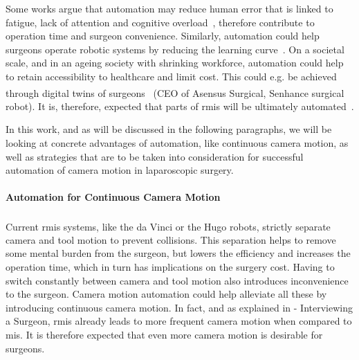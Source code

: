 
Some works argue that automation may reduce human error that is linked to fatigue, lack of attention and cognitive overload~\cite{fiorini2022concepts}, therefore contribute to operation time and surgeon convenience. Similarly, automation could help surgeons operate robotic systems by reducing the learning curve~\cite{van2018learning}. On a societal scale, and in an ageing society with shrinking workforce, automation could help to retain accessibility to healthcare and limit cost. This could e.g. be achieved through digital twins of surgeons~\cite{zidane2023robotics} (CEO of Asensus Surgical, Senhance\textsuperscript{\texttrademark} surgical robot). It is, therefore, expected that parts of \gls{rmis} will be ultimately automated~\cite{davenport2019potential,zidane2023robotics}.

In this work, and as will be discussed in the following paragraphs, we will be looking at concrete advantages of automation, like continuous camera motion, as well as strategies that are to be taken into consideration for successful automation of camera motion in laparoscopic surgery.


\paragraph{Automation for Continuous Camera Motion} Current \gls{rmis} systems, like the da Vinci\textsuperscript{\textregistered} or the Hugo\textsuperscript{\texttrademark} robots, strictly separate camera and tool motion to prevent collisions. This separation helps to remove some mental burden from the surgeon, but lowers the efficiency and increases the operation time, which in turn has implications on the surgery cost. Having to switch constantly between camera and tool motion also introduces inconvenience to the surgeon. Camera motion automation could help alleviate all these by introducing continuous camera motion. In fact, and as explained in  - Interviewing a Surgeon, \gls{rmis} already leads to more frequent camera motion when compared to \gls{mis}. It is therefore expected that even more camera motion is desirable for surgeons.

